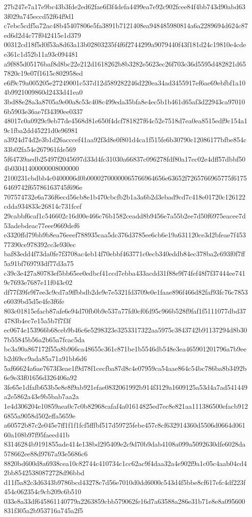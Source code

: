 {27b247e7a17e9bc43b3fde2ed62fae6f3f4defa4499ea7e92c902fcee84f4bb743d90abd633f029a745eccd52f64f9d1
c7ebc5cdf5a72ac48b45407806e5fa3891b7121408ea948485980814a6a2289694d624c87ed6d2d4c77f042415e1d379
00312cd18f5d0f53a8d63a13b02803235f4f6f2744299a9079440f43f181d24c19810e4cdee361c1d52b11a93c094481
a9f885d05176baf8d8bc22e212d1618262b8b3282e5623ec26f703c36d5595d482821d657820c19e07f1615c802958ed
e6f9c79a005205e27249001c537d12d589282246d220ea34ad3455917ef6ae69ebfbf1a104b9921009860d2433d41ea0
3bd88e28a3a8705a9e00a8c53c408c499eda35bfa8e4ec5b1b461d65af3d22943ca970106b5903e36ae7f34390ee0337
48017c0a0929c9eb77de4568d81e650f4dcf781827f64c52e7518d7ea0ea8515edf9c154a19c1fba2dd45221d0e96981
a3924d74d2e3b1d26acccef41aa92f3d8e0f801d4ca1f515fe6b30790c12086177bfbe854c33b02fa54e267961fde569
5f64739aedb25497f2045697d33d4fc31030a66837c096278fdf80a17ec02e4dff57dbbf504b03041400000008000000
2100231cbdbb4c0400006d0b00002700000065766964656e63652f7265766965775f61756469742f65786163745f696e
707574732e6a736f6ecd56cb8e1b470cbcfb2b1a3a6b2d3ebad9cd7c418e01720c126122cdda934833c26814c731fcef
29cabbf6caf1c546602c16d00e466c76b1582ceadd8b9456e7a55b2ee7d50f6975eacee7d53adebdeac77eee9669def6
e3320ffd79bb9b8ea76eeef788935caa5dc376d3785ee6cb6e19a631120ce3d2bfeae7f45377390ce978392cc3e930ec
baf83edd4f73da0fe7f3708ac4eb14f70ebbf463771c0ecb340eddb84ec378ba2c693f0f7ff5a91bf769793df77d3a75
c39c3e427a80783ef5bb65ee0edbcf41ccd7ebba433acdd31f88e9f74fef48f7f37444ee7419c7693e7687e11f043c02
df77f39fe9f7ee3c9cd7a9ffbbdb2de9e7e5321fd3709e0e1faae896f466d82faf93fc76c7853e6039bd5d5e4fe3f6fe
803c01815efacb87afe6e94d70fb0b9e537a77fd0cf0fd95c966b528f9faf1f5111077dbd374783b4ec7e15a5b7f7f3f
ec0674e153966b68ceb9b46c6e5298323e3253317322aa5975c3843742b91137294d8b307b55845b56a2b65a7fcac5da
bc3a90a867172f55a8b966ca48655c361c871be1b5546db548e3ea465901201796a7b9eeb2d69cc9ada85a71a91bb6d6
5af66624a6ae7673f3eae1f9d78f1cecfba87d8c4e07959ca54aae864c54bc786ba8b3492b6e9e33f01656d326406a92
3fe65e1dfafb653b5e8e8f9ab921efae0832061992b914f3129a1609125a53d4a7ad541449a2e5862a43e9b5bab7aa2a
1e4d306204e10859aea0c7c0b82968cafaf4a01614825ed7ec8e821aa111386500efacb9126855a9058d502effa5659e
a60572b87c2e045e7ff1f1f1fcf5fffbf517d59725febe457c8cf632914360d5506d0664d06160a108b97f95faeed41b
83146284b9191855ade414e138bd295409e2c9d70b9dab4108a099a5092630dfe6028da578662ee88d9767a93e5686c6
8820bd600d8a6938cea10c82744c410734c1cc62ac9f4daa32a4e902f9a1c05c4aab04cd42bb85425380872728d96bbd
d11f5a82c3d6343b9786bcd43278c7d56e7010d0dd6000c543d4f5bbe8cf617efc4df223f454c062354c9cb209c6b510
033e8a33df645861140779a2263859cbb579062fe16d7a63588a286e31b71e8e8a095600831f305a2b953716a745a2f5
}
